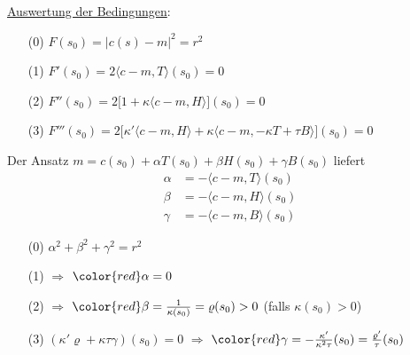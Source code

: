 \uline{Auswertung der Bedingungen}: 
\begin{enumerate}
 \item[(0)] \(F(s_0) = | c(s) - m|^2 = r^2\)
 \item[(1)] \(F'(s_0) = 2 \langle c-m, T \rangle (s_0) = 0\)
 \item[(2)] \(F''(s_0) = 2 \big[ 1 + \kappa \langle c-m, H\rangle \big] (s_0) = 0\)
 \item[(3)] \(F'''(s_0) = 2 \big[ \kappa' \langle c-m, H\rangle + \kappa \langle c-m, -\kappa T + \tau B\rangle \big](s_0) = 0\)
\end{enumerate}

Der Ansatz \(m = c(s_0) + \alpha T(s_0) + \beta H(s_0) + \gamma B(s_0)\) liefert
\begin{align*}
 \alpha &= - \langle c-m, T \rangle(s_0) \\
 \beta &= -\langle c-m, H \rangle(s_0) \\
 \gamma &= -\langle c-m, B\rangle (s_0)
\end{align*}
\begin{enumerate}
 \item[(0)] \(\alpha^2 + \beta^2 + \gamma^2 = r^2\)
 \item[(1)] \(\Rightarrow\) \({\color{red}\alpha = 0}\)
 \item[(2)] \(\Rightarrow\) \({\color{red}\beta = \frac1{\kappa(s_0)}} = \varrho(s_0) > 0\) (falls \(\kappa(s_0) > 0\))
 \item[(3)] \((\kappa' \varrho + \kappa \tau \gamma)(s_0) = 0\) \(\Rightarrow\) \({\color{red}\gamma = - \frac{\kappa'}{\kappa^2 \tau}(s_0) = \frac{\varrho'}{\tau}(s_0)}\) 
\end{enumerate}

